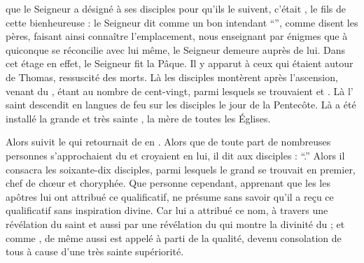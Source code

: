 que le Seigneur a désigné à ses disciples pour qu'ils le suivent,
c'était , le fils de cette bienheureuse  :
le Seigneur  dit comme un bon intendant \enquote{},
comme disent les pères, faisant  ainsi connaître l'emplacement,
nous enseignant par énigmes que à quiconque se réconcilie avec lui même, le Seigneur demeure auprès de lui.%
Dans cet étage en effet, le Seigneur fit la Pâque. %
Il  y apparut à ceux qui étaient autour de Thomas, ressuscité des morts.
Là les disciples montèrent après l'ascension, venant du ,
étant au nombre de cent-vingt, parmi lesquels se trouvaient  et .
Là l' saint descendit en langues de feu sur les disciples le jour de la Pentecôte. 
Là a été installé la grande et très sainte , la mère de toutes les Églises.%

Alors  suivit le  qui retournait de  en . 
Alors que de toute part de nombreuses personnes s'approchaient du 
et croyaient en lui, il dit aux disciples		: %
\enquote{.}
Alors il consacra les soixante-dix disciples, 
parmi lesquels  le grand  se trouvait en premier, chef de chœur et choryphée. %
Que personne cependant,
apprenant que les les apôtres lui ont attribué ce qualificatif,
ne présume sans savoir
qu'il a reçu ce qualificatif sans inspiration divine. 
Car  lui a attribué ce nom, 
à travers une révélation du saint 
et aussi par une révélation du  qui montre la divinité du  ;
et comme ,
de même  aussi  est appelé   
  à parti de la qualité,
devenu consolation de tous à cause d'une très sainte supériorité. 

